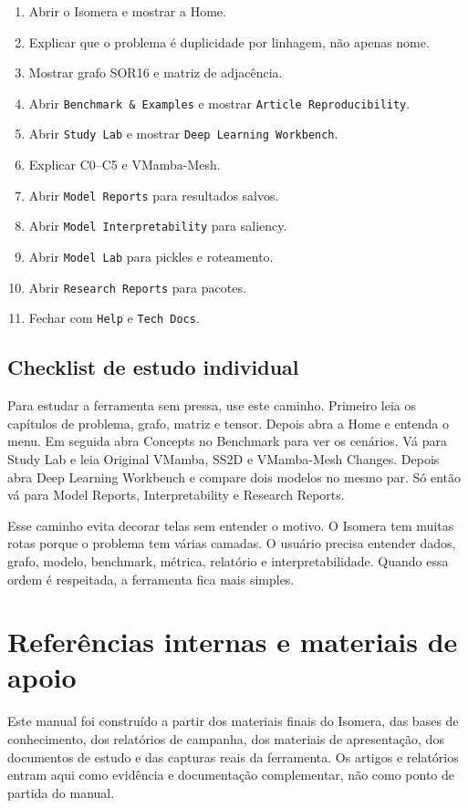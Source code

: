 \documentclass[12pt,oneside]{book}
\newcommand{\route}[1]{\texttt{#1}}
\begin{document}
\begin{enumerate}
  \item Abrir o Isomera e mostrar a Home.
  \item Explicar que o problema é duplicidade por linhagem, não apenas nome.
  \item Mostrar grafo SOR16 e matriz de adjacência.
  \item Abrir \route{Benchmark \& Examples} e mostrar \route{Article Reproducibility}.
  \item Abrir \route{Study Lab} e mostrar \route{Deep Learning Workbench}.
  \item Explicar C0--C5 e VMamba-Mesh.
  \item Abrir \route{Model Reports} para resultados salvos.
  \item Abrir \route{Model Interpretability} para saliency.
  \item Abrir \route{Model Lab} para pickles e roteamento.
  \item Abrir \route{Research Reports} para pacotes.
  \item Fechar com \route{Help} e \route{Tech Docs}.
\end{enumerate}

\section{Checklist de estudo individual}

Para estudar a ferramenta sem pressa, use este caminho. Primeiro leia os capítulos de problema, grafo, matriz e tensor. Depois abra a Home e entenda o menu. Em seguida abra Concepts no Benchmark para ver os cenários. Vá para Study Lab e leia Original VMamba, SS2D e VMamba-Mesh Changes. Depois abra Deep Learning Workbench e compare dois modelos no mesmo par. Só então vá para Model Reports, Interpretability e Research Reports.

Esse caminho evita decorar telas sem entender o motivo. O Isomera tem muitas rotas porque o problema tem várias camadas. O usuário precisa entender dados, grafo, modelo, benchmark, métrica, relatório e interpretabilidade. Quando essa ordem é respeitada, a ferramenta fica mais simples.

\chapter{Referências internas e materiais de apoio}

Este manual foi construído a partir dos materiais finais do Isomera, das bases de conhecimento, dos relatórios de campanha, dos materiais de apresentação, dos documentos de estudo e das capturas reais da ferramenta. Os artigos e relatórios entram aqui como evidência e documentação complementar, não como ponto de partida do manual.
\end{document}
